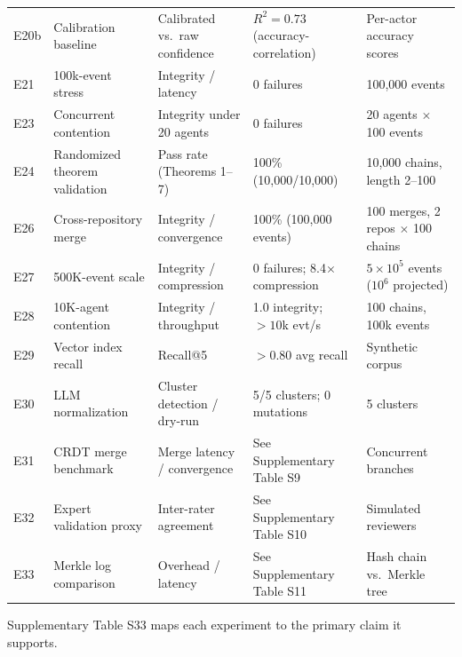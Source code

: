 \begin{table}[htbp]
\begin{tabularx}{\textwidth}{@{}p{1.8cm}p{2.8cm}XXX@{}}
E20b & Calibration baseline & Calibrated vs.\ raw confidence & $R^2 = 0.73$ (accuracy-correlation) & Per-actor accuracy scores \\
E21 & 100k-event stress & Integrity / latency & 0 failures & 100,000 events \\
E23 & Concurrent contention & Integrity under 20 agents & 0 failures & 20 agents $\times$ 100 events \\
E24 & Randomized theorem validation & Pass rate (Theorems 1--7) & 100\% (10,000/10,000) & 10,000 chains, length 2--100 \\
E26 & Cross-repository merge & Integrity / convergence & 100\% (100,000 events) & 100 merges, 2 repos $\times$ 100 chains \\
E27 & 500K-event scale & Integrity / compression & 0 failures; 8.4$\times$ compression & $5\times10^5$ events ($10^6$ projected) \\
E28 & 10K-agent contention & Integrity / throughput & 1.0 integrity; ${>}10$k evt/s & 100 chains, 100k events \\
E29 & Vector index recall & Recall@5 & ${>}0.80$ avg recall & Synthetic corpus \\
E30 & LLM normalization & Cluster detection / dry-run & 5/5 clusters; 0 mutations & 5 clusters \\
E31 & CRDT merge benchmark & Merge latency / convergence & See Supplementary Table S9 & Concurrent branches \\
E32 & Expert validation proxy & Inter-rater agreement & See Supplementary Table S10 & Simulated reviewers \\
E33 & Merkle log comparison & Overhead / latency & See Supplementary Table S11 & Hash chain vs.\ Merkle tree \\
\bottomrule
\end{tabularx}
\end{table}

Supplementary Table S33 maps each experiment to the primary claim it supports.

